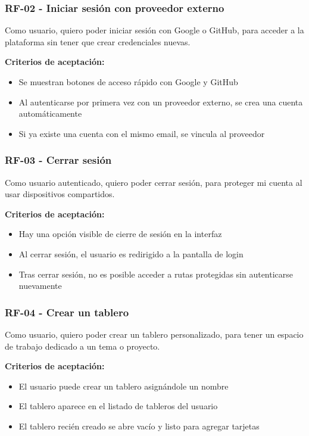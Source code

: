 \subsubsection*{RF-02 - Iniciar sesión con proveedor externo}
Como usuario, quiero poder iniciar sesión con Google o GitHub, para acceder a la plataforma sin tener que crear credenciales nuevas.

\textbf{Criterios de aceptación:}
\begin{itemize}
  \item Se muestran botones de acceso rápido con Google y GitHub
  \item Al autenticarse por primera vez con un proveedor externo, se crea una cuenta automáticamente
  \item Si ya existe una cuenta con el mismo email, se vincula al proveedor
\end{itemize}

\subsubsection*{RF-03 - Cerrar sesión}
Como usuario autenticado, quiero poder cerrar sesión, para proteger mi cuenta al usar dispositivos compartidos.

\textbf{Criterios de aceptación:}
\begin{itemize}
  \item Hay una opción visible de cierre de sesión en la interfaz
  \item Al cerrar sesión, el usuario es redirigido a la pantalla de login
  \item Tras cerrar sesión, no es posible acceder a rutas protegidas sin autenticarse nuevamente
\end{itemize}

\subsubsection*{RF-04 - Crear un tablero}
Como usuario, quiero poder crear un tablero personalizado, para tener un espacio de trabajo dedicado a un tema o proyecto.

\textbf{Criterios de aceptación:}
\begin{itemize}
  \item El usuario puede crear un tablero asignándole un nombre
  \item El tablero aparece en el listado de tableros del usuario
  \item El tablero recién creado se abre vacío y listo para agregar tarjetas
\end{itemize}

